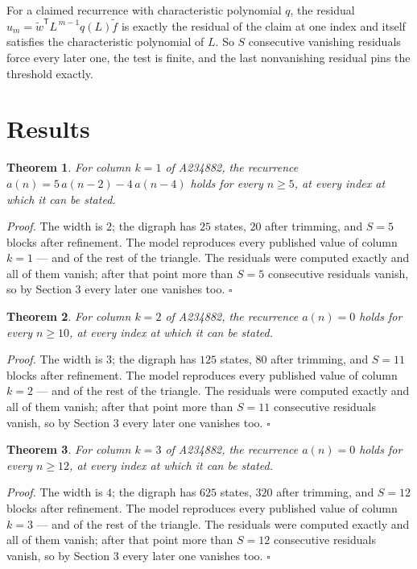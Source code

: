 \documentclass[11pt]{article}
\newtheorem{theorem}{Theorem}
\theoremstyle{definition}
\begin{document}
For a claimed recurrence with characteristic polynomial $q$, the residual $u_m = \tilde w^{\mathsf T}L^{\,m-1}q(L)\tilde f$ is exactly the residual of the claim at one index and itself satisfies the characteristic polynomial of $L$. So $S$ consecutive vanishing residuals force every later one, the test is finite, and the last nonvanishing residual pins the threshold exactly.

\section{Results}

\begin{theorem} For column $k = 1$ of A234882, the recurrence $a(n) = 5\,a(n-2) - 4\,a(n-4)$ holds for every $n \ge 5$, at every index at which it can be stated.\end{theorem}

{\itshape Proof.} The width is $2$; the digraph has $25$ states, $20$ after trimming, and $S = 5$ blocks after refinement. The model reproduces every published value of column $k = 1$ --- and of the rest of the triangle. The residuals were computed exactly and all of them vanish; after that point more than $S = 5$ consecutive residuals vanish, so by Section 3 every later one vanishes too. $\square$

\begin{theorem} For column $k = 2$ of A234882, the recurrence $a(n) = 0$ holds for every $n \ge 10$, at every index at which it can be stated.\end{theorem}

{\itshape Proof.} The width is $3$; the digraph has $125$ states, $80$ after trimming, and $S = 11$ blocks after refinement. The model reproduces every published value of column $k = 2$ --- and of the rest of the triangle. The residuals were computed exactly and all of them vanish; after that point more than $S = 11$ consecutive residuals vanish, so by Section 3 every later one vanishes too. $\square$

\begin{theorem} For column $k = 3$ of A234882, the recurrence $a(n) = 0$ holds for every $n \ge 12$, at every index at which it can be stated.\end{theorem}

{\itshape Proof.} The width is $4$; the digraph has $625$ states, $320$ after trimming, and $S = 12$ blocks after refinement. The model reproduces every published value of column $k = 3$ --- and of the rest of the triangle. The residuals were computed exactly and all of them vanish; after that point more than $S = 12$ consecutive residuals vanish, so by Section 3 every later one vanishes too. $\square$
\end{document}
